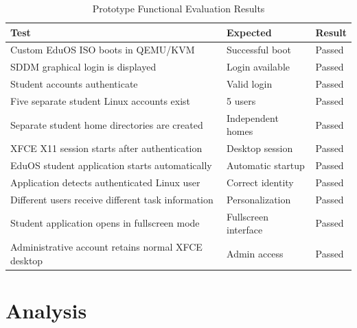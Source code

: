 \documentclass{tietreport}
\begin{document}
\begin{table}[H]
\centering
\renewcommand{\arraystretch}{1.25}

\begin{tabular}{|p{}|p{}|p{}|}
\hline
\textbf{Test} & \textbf{Expected} & \textbf{Result} \\
\hline

Custom EduOS ISO boots in QEMU/KVM &
Successful boot &
Passed \\
\hline

SDDM graphical login is displayed &
Login available &
Passed \\
\hline

Student accounts authenticate &
Valid login &
Passed \\
\hline

Five separate student Linux accounts exist &
5 users &
Passed \\
\hline

Separate student home directories are created &
Independent homes &
Passed \\
\hline

XFCE X11 session starts after authentication &
Desktop session &
Passed \\
\hline

EduOS student application starts automatically &
Automatic startup &
Passed \\
\hline

Application detects authenticated Linux user &
Correct identity &
Passed \\
\hline

Different users receive different task information &
Personalization &
Passed \\
\hline

Student application opens in fullscreen mode &
Fullscreen interface &
Passed \\
\hline

Administrative account retains normal XFCE desktop &
Admin access &
Passed \\
\hline

\end{tabular}

\caption{Prototype Functional Evaluation Results}
\label{tab:test-results}
\end{table}


\section{Analysis}
\end{document}
